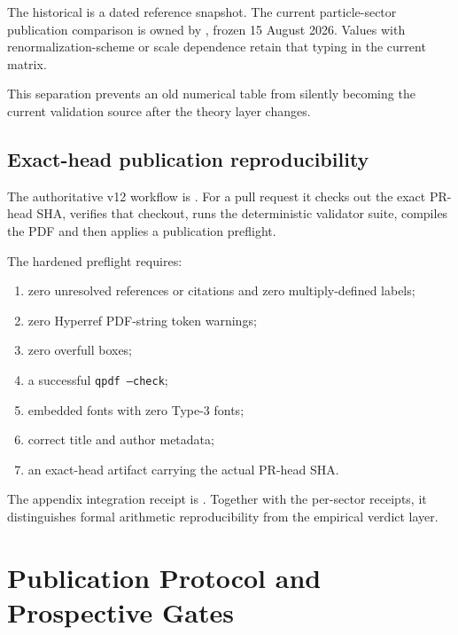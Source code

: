 The historical
is a dated reference snapshot.  The current particle-sector publication
comparison is owned by
,
frozen 15 August 2026.  Values with renormalization-scheme or scale dependence
retain that typing in the current matrix.

This separation prevents an old numerical table from silently becoming the
current validation source after the theory layer changes.

\section{Exact-head publication reproducibility}

The authoritative v12 workflow is
.
For a pull request it checks out the exact PR-head SHA, verifies that checkout,
runs the deterministic validator suite, compiles the PDF and then applies a
publication preflight.

The hardened preflight requires:
\begin{enumerate}
\item zero unresolved references or citations and zero multiply-defined labels;
\item zero Hyperref PDF-string token warnings;
\item zero overfull boxes;
\item a successful \texttt{qpdf --check};
\item embedded fonts with zero Type-3 fonts;
\item correct title and author metadata;
\item an exact-head artifact carrying the actual PR-head SHA.
\end{enumerate}

The appendix integration receipt is
.
Together with the per-sector receipts, it distinguishes formal arithmetic
reproducibility from the empirical verdict layer.

\clearpage

\chapter{Publication Protocol and Prospective Gates}
\label{app:v12_publication_protocol}

